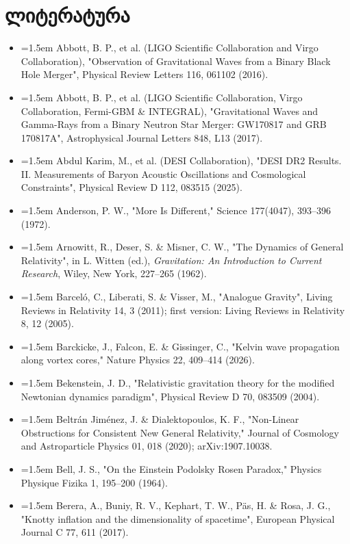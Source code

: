 \documentclass[11pt,a4paper]{article}
\begin{document}
\section*{ლიტერატურა}
\begin{itemize}[leftmargin=1.5em,label={}]
\item \hangindent=1.5em Abbott, B. P., et al. (LIGO Scientific Collaboration and Virgo Collaboration), "Observation of Gravitational Waves from a Binary Black Hole Merger", Physical Review Letters 116, 061102 (2016).
\item \hangindent=1.5em Abbott, B. P., et al. (LIGO Scientific Collaboration, Virgo Collaboration, Fermi-GBM \& INTEGRAL), "Gravitational Waves and Gamma-Rays from a Binary Neutron Star Merger: GW170817 and GRB 170817A", Astrophysical Journal Letters 848, L13 (2017).
\item \hangindent=1.5em Abdul Karim, M., et al. (DESI Collaboration), "DESI DR2 Results. II. Measurements of Baryon Acoustic Oscillations and Cosmological Constraints", Physical Review D 112, 083515 (2025).
\item \hangindent=1.5em Anderson, P. W., "More Is Different," Science 177(4047), 393–396 (1972).
\item \hangindent=1.5em Arnowitt, R., Deser, S. \& Misner, C. W., "The Dynamics of General Relativity", in L. Witten (ed.), \emph{Gravitation: An Introduction to Current Research}, Wiley, New York, 227–265 (1962).
\item \hangindent=1.5em Barceló, C., Liberati, S. \& Visser, M., "Analogue Gravity", Living Reviews in Relativity 14, 3 (2011); first version: Living Reviews in Relativity 8, 12 (2005).
\item \hangindent=1.5em Barckicke, J., Falcon, E. \& Gissinger, C., "Kelvin wave propagation along vortex cores," Nature Physics 22, 409–414 (2026).
\item \hangindent=1.5em Bekenstein, J. D., "Relativistic gravitation theory for the modified Newtonian dynamics paradigm", Physical Review D 70, 083509 (2004).
\item \hangindent=1.5em Beltrán Jiménez, J. \& Dialektopoulos, K. F., "Non-Linear Obstructions for Consistent New General Relativity," Journal of Cosmology and Astroparticle Physics 01, 018 (2020); arXiv:1907.10038.
\item \hangindent=1.5em Bell, J. S., "On the Einstein Podolsky Rosen Paradox," Physics Physique Fizika 1, 195–200 (1964).
\item \hangindent=1.5em Berera, A., Buniy, R. V., Kephart, T. W., Päs, H. \& Rosa, J. G., "Knotty inflation and the dimensionality of spacetime", European Physical Journal C 77, 611 (2017).

\end{itemize}
\end{document}
